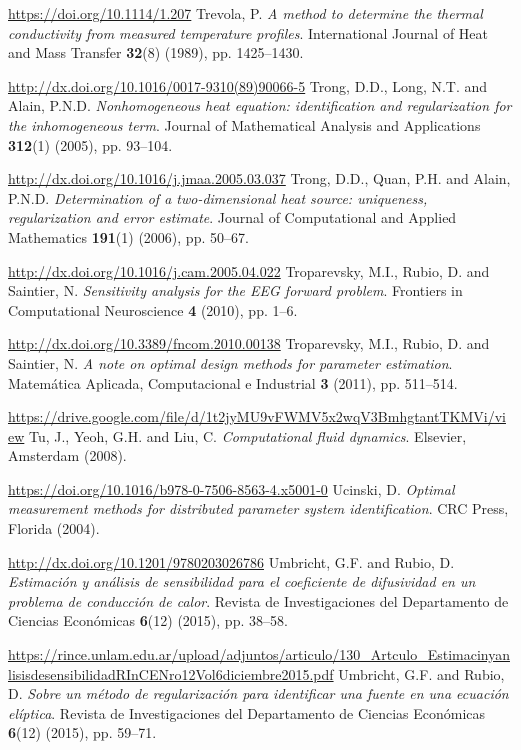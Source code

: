\begin{thebibliography}{301}
\url{https://doi.org/10.1114/1.207}
%
%
 Trevola, P. {\it A method to determine the thermal conductivity from measured temperature profiles}. International Journal of Heat and Mass Transfer {\bf 32}(8) (1989), pp. 1425--1430.

\url{http://dx.doi.org/10.1016/0017-9310(89)90066-5}
%
%
 Trong, D.D., Long, N.T. and Alain, P.N.D. {\it Nonhomogeneous heat equation: identification and regularization for the inhomogeneous term}. Journal of Mathematical Analysis and Applications {\bf 312}(1) (2005), pp. 93--104.

\url{http://dx.doi.org/10.1016/j.jmaa.2005.03.037}
%
%
 Trong, D.D., Quan, P.H. and Alain, P.N.D. {\it Determination of a two-dimensional heat source: uniqueness, regularization and error estimate}. Journal of Computational and Applied Mathematics {\bf 191}(1) (2006), pp. 50--67.

\url{http://dx.doi.org/10.1016/j.cam.2005.04.022}
%
%
 Troparevsky, M.I., Rubio, D. and Saintier, N. {\it Sensitivity analysis for the EEG forward problem}. Frontiers in Computational Neuroscience {\bf 4} (2010), pp. 1--6.

\url{http://dx.doi.org/10.3389/fncom.2010.00138}
%
%
 Troparevsky, M.I., Rubio, D. and Saintier, N. {\it A note on optimal design methods for parameter estimation}. Matem\'atica Aplicada, Computacional e Industrial {\bf 3} (2011), pp. 511--514.

\sloppy
\url{https://drive.google.com/file/d/1t2jyMU9vFWMV5x2wqV3BmhgtantTKMVi/view}
%
%
 Tu, J., Yeoh, G.H. and Liu, C. {\it Computational fluid dynamics}. Elsevier, Amsterdam (2008).

\url{https://doi.org/10.1016/b978-0-7506-8563-4.x5001-0}
%
%
 Ucinski, D. {\it Optimal measurement methods for distributed parameter system identification}. CRC Press, Florida (2004).

\url{http://dx.doi.org/10.1201/9780203026786}
%
%
 Umbricht, G.F. and Rubio, D. {\it Estimaci\'on y an\'alisis de sensibilidad para el coeficiente de difusividad en un problema de conducci\'on de calor}. Revista de Investigaciones del Departamento de Ciencias Econ\'omicas {\bf 6}(12) (2015), pp. 38--58.

\sloppy
\url{https://rince.unlam.edu.ar/upload/adjuntos/articulo/130_Artculo_EstimacinyanlisisdesensibilidadRInCENro12Vol6diciembre2015.pdf} 
%
%
 Umbricht, G.F. and Rubio, D. {\it Sobre un m\'etodo de regularizaci\'on para identificar una fuente en una ecuaci\'on el\'iptica}. Revista de Investigaciones del Departamento de Ciencias Econ\'omicas {\bf 6}(12) (2015), pp. 59--71.


\end{thebibliography}

